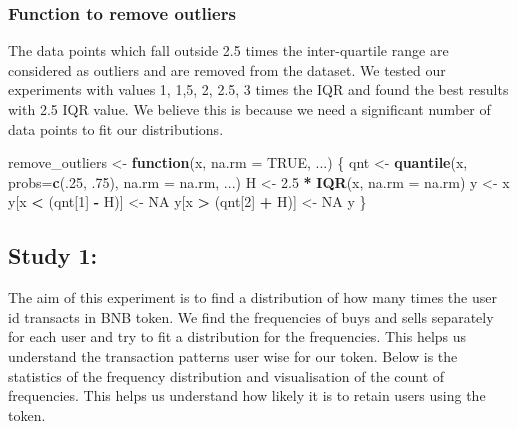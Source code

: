 \documentclass[]{article}
\newenvironment{Shaded}{\begin{snugshade}}{\end{snugshade}}
\newcommand{\KeywordTok}[1]{\textcolor[rgb]{0.13,0.29,0.53}{\textbf{#1}}}
\newcommand{\DataTypeTok}[1]{\textcolor[rgb]{0.13,0.29,0.53}{#1}}
\newcommand{\DecValTok}[1]{\textcolor[rgb]{0.00,0.00,0.81}{#1}}
\newcommand{\FloatTok}[1]{\textcolor[rgb]{0.00,0.00,0.81}{#1}}
\newcommand{\StringTok}[1]{\textcolor[rgb]{0.31,0.60,0.02}{#1}}
\newcommand{\OtherTok}[1]{\textcolor[rgb]{0.56,0.35,0.01}{#1}}
\newcommand{\ControlFlowTok}[1]{\textcolor[rgb]{0.13,0.29,0.53}{\textbf{#1}}}
\newcommand{\OperatorTok}[1]{\textcolor[rgb]{0.81,0.36,0.00}{\textbf{#1}}}
\newcommand{\NormalTok}[1]{#1}
\begin{document}
\subsubsection{Function to remove
outliers}\label{function-to-remove-outliers}

The data points which fall outside 2.5 times the inter-quartile range
are considered as outliers and are removed from the dataset. We tested
our experiments with values 1, 1,5, 2, 2.5, 3 times the IQR and found
the best results with 2.5 IQR value. We believe this is because we need
a significant number of data points to fit our distributions.

\begin{Shaded}
\begin{Highlighting}[]
\NormalTok{remove_outliers <-}\StringTok{ }\ControlFlowTok{function}\NormalTok{(x, }\DataTypeTok{na.rm =} \OtherTok{TRUE}\NormalTok{, ...) \{}
\NormalTok{  qnt <-}\StringTok{ }\KeywordTok{quantile}\NormalTok{(x, }\DataTypeTok{probs=}\KeywordTok{c}\NormalTok{(.}\DecValTok{25}\NormalTok{, .}\DecValTok{75}\NormalTok{), }\DataTypeTok{na.rm =}\NormalTok{ na.rm, ...)}
\NormalTok{  H <-}\StringTok{ }\FloatTok{2.5} \OperatorTok{*}\StringTok{ }\KeywordTok{IQR}\NormalTok{(x, }\DataTypeTok{na.rm =}\NormalTok{ na.rm)}
\NormalTok{  y <-}\StringTok{ }\NormalTok{x}
\NormalTok{  y[x }\OperatorTok{<}\StringTok{ }\NormalTok{(qnt[}\DecValTok{1}\NormalTok{] }\OperatorTok{-}\StringTok{ }\NormalTok{H)] <-}\StringTok{ }\OtherTok{NA}
\NormalTok{  y[x }\OperatorTok{>}\StringTok{ }\NormalTok{(qnt[}\DecValTok{2}\NormalTok{] }\OperatorTok{+}\StringTok{ }\NormalTok{H)] <-}\StringTok{ }\OtherTok{NA}
\NormalTok{  y}
\NormalTok{\}}
\end{Highlighting}
\end{Shaded}

\subsection{Study 1:}\label{study-1}

The aim of this experiment is to find a distribution of how many times
the user id transacts in BNB token. We find the frequencies of buys and
sells separately for each user and try to fit a distribution for the
frequencies. This helps us understand the transaction patterns user wise
for our token. Below is the statistics of the frequency distribution and
visualisation of the count of frequencies. This helps us understand how
likely it is to retain users using the token.
\end{document}
